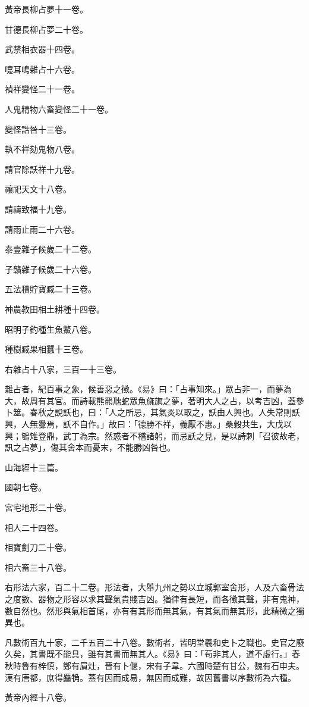 \begin{pinyinscope}
黃帝長柳占夢十一卷。

甘德長柳占夢二十卷。

武禁相衣器十四卷。

嚏耳鳴雜占十六卷。

禎祥變怪二十一卷。

人鬼精物六畜變怪二十一卷。

變怪誥咎十三卷。

執不祥劾鬼物八卷。

請官除訞祥十九卷。

禳祀天文十八卷。

請禱致福十九卷。

請雨止雨二十六卷。

泰壹雜子候歲二十二卷。

子贛雜子候歲二十六卷。

五法積貯寶臧二十三卷。

神農教田相土耕種十四卷。

昭明子釣種生魚鱉八卷。

種樹臧果相蠶十三卷。

右雜占十八家，三百一十三卷。

雜占者，紀百事之象，候善惡之徵。《易》曰：「占事知來。」眾占非一，而夢為大，故周有其官。而詩載熊羆虺蛇眾魚旐旟之夢，著明大人之占，以考吉凶，蓋參卜筮。春秋之說訞也，曰：「人之所忌，其氣炎以取之，訞由人興也。人失常則訞興，人無釁焉，訞不自作。」故曰：「德勝不祥，義厭不惠。」桑穀共生，大戊以興；鴝雉登鼎，武丁為宗。然惑者不稽諸躬，而忌訞之見，是以詩刺「召彼故老，訊之占夢」，傷其舍本而憂末，不能勝凶咎也。

山海經十三篇。

國朝七卷。

宮宅地形二十卷。

相人二十四卷。

相寶劍刀二十卷。

相六畜三十八卷。

右形法六家，百二十二卷。形法者，大舉九州之勢以立城郭室舍形，人及六畜骨法之度數、器物之形容以求其聲氣貴賤吉凶。猶律有長短，而各徵其聲，非有鬼神，數自然也。然形與氣相首尾，亦有有其形而無其氣，有其氣而無其形，此精微之獨異也。

凡數術百九十家，二千五百二十八卷。數術者，皆明堂羲和史卜之職也。史官之廢久矣，其書既不能具，雖有其書而無其人。《易》曰：「苟非其人，道不虛行。」春秋時魯有梓慎，鄭有屓灶，晉有卜偃，宋有子韋。六國時楚有甘公，魏有石申夫。漢有唐都，庶得麤觕。蓋有因而成易，無因而成難，故因舊書以序數術為六種。

黃帝內經十八卷。


\end{pinyinscope}
